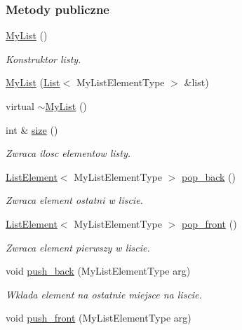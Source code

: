 \subsubsection*{Metody publiczne}
\begin{DoxyCompactItemize}
\item 
\hyperlink{class_my_list_acda6bd1dd01b31aa3947e3e26695d219}{My\-List} ()
\begin{DoxyCompactList}\small\item\em Konstruktor listy. \end{DoxyCompactList}\item 
\hyperlink{class_my_list_aec4c7d8da8bffbe1e6bfd68765fa4981}{My\-List} (\hyperlink{class_list}{List}$<$ My\-List\-Element\-Type $>$ \&list)
\item 
virtual \hyperlink{class_my_list_ae2bed585526d0215f0afd6fd82a03cc9}{$\sim$\-My\-List} ()
\item 
int \& \hyperlink{class_my_list_a267f669859ef3541333082cad6b28ab7}{size} ()
\begin{DoxyCompactList}\small\item\em Zwraca ilosc elementow listy. \end{DoxyCompactList}\item 
\hyperlink{class_list_element}{List\-Element}$<$ My\-List\-Element\-Type $>$ \hyperlink{class_my_list_a8ebb806121d42e08834c7d244521c008}{pop\-\_\-back} ()
\begin{DoxyCompactList}\small\item\em Zwraca element ostatni w liscie. \end{DoxyCompactList}\item 
\hyperlink{class_list_element}{List\-Element}$<$ My\-List\-Element\-Type $>$ \hyperlink{class_my_list_a675af07472a5b7dde7ca602abb420efa}{pop\-\_\-front} ()
\begin{DoxyCompactList}\small\item\em Zwraca element pierwszy w liscie. \end{DoxyCompactList}\item 
void \hyperlink{class_my_list_a52dad29ecf7522b86df8daa3aa74702d}{push\-\_\-back} (My\-List\-Element\-Type arg)
\begin{DoxyCompactList}\small\item\em Wklada element na ostatnie miejsce na liscie. \end{DoxyCompactList}\item 
void \hyperlink{class_my_list_aafeb562fa9d79f171a21988afd08a833}{push\-\_\-front} (My\-List\-Element\-Type arg)

\end{DoxyCompactItemize}
